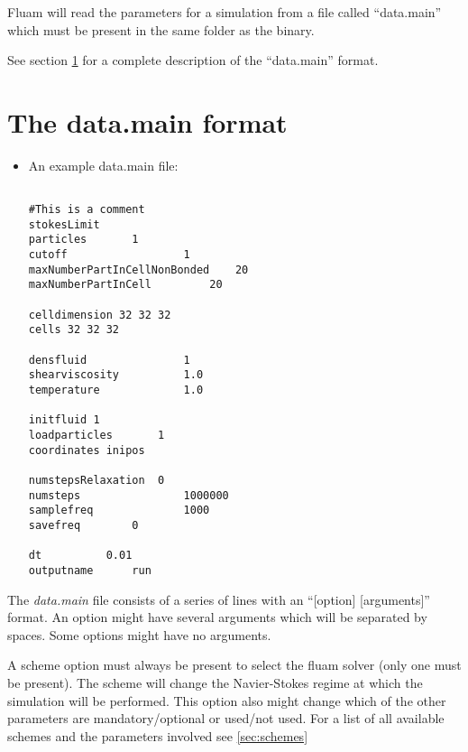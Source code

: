 \documentclass[a4paper,11pt]{refart}
\begin{document}
Fluam will read the parameters for a simulation from a file called ``data.main'' which must be present in the same folder as the binary.

See section \ref{datamain} for a complete description of the ``data.main'' format.


\section{The data.main format} \label{datamain}





\begin{itemize}
\item An example data.main file:
\begin{lstlisting}

#This is a comment
stokesLimit
particles		1
cutoff                  1
maxNumberPartInCellNonBonded    20
maxNumberPartInCell     	20

celldimension 32 32 32
cells 32 32 32

densfluid               1
shearviscosity          1.0
temperature             1.0

initfluid 1
loadparticles		1
coordinates inipos

numstepsRelaxation	0
numsteps                1000000
samplefreq              1000
savefreq		0

dt			0.01
outputname		run
\end{lstlisting}
\end{itemize}
The \emph{data.main} file consists of a series of lines with an ``[option] [arguments]'' format. An option might have several arguments which will be separated by spaces. Some options might have no arguments.

A scheme option must always be present to select the fluam solver (only one must be present). The scheme will change the Navier-Stokes regime at which the simulation will be performed. This option also might change which of the other parameters are mandatory/optional or used/not used. For a list of all available schemes and the parameters involved see \ref{sec:schemes}
\end{document}
